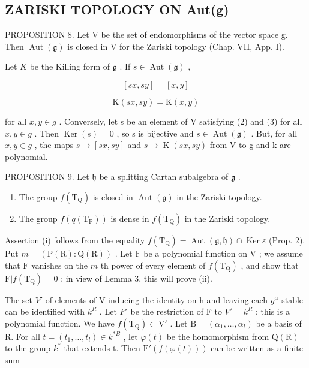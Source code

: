 \subsection{ZARISKI TOPOLOGY ON Aut(g)}

PROPOSITION 8. Let V be the set of endomorphisms of the vector space g. Then \(\operatorname{Aut}(\mathfrak{g})\) is closed in V for the Zariski topology (Chap. VII, App. I).

Let \(K\) be the Killing form of \(\mathfrak{g}\) . If \(s \in \operatorname{Aut}(\mathfrak{g})\) ,

\[
  [ s x, s y ] = [ x, y ]\tag{2}
\]

\[
\mathrm{K} (s x, s y) = \mathrm{K} (x, y)\tag{3}
\]

for all \(x, y \in g\) . Conversely, let s be an element of V satisfying (2) and (3) for all \(x, y \in g\) . Then \(\operatorname{Ker}(s) = 0\) , so s is bijective and \(s \in \operatorname{Aut}(\mathfrak{g})\) . But, for all \(x, y \in g\) , the maps \(s \mapsto [sx, sy]\) and \(s \mapsto \operatorname{K}(sx, sy)\) from V to g and k are polynomial.

PROPOSITION 9. Let \(\mathfrak{h}\) be a splitting Cartan subalgebra of \(\mathfrak{g}\) .

\begin{enumerate}
\def\labelenumi{(\roman{enumi})}
\item
  The group \(f(\mathrm{T}_{\mathrm{Q}})\) is closed in \(\operatorname{Aut}(\mathfrak{g})\) in the Zariski topology.
\item
  The group \(f(q(\mathrm{T_P}))\) is dense in \(f(\mathrm{T_Q})\) in the Zariski topology.
\end{enumerate}

Assertion (i) follows from the equality \(f(\mathrm{T}_{\mathrm{Q}}) = \operatorname{Aut}(\mathfrak{g},\mathfrak{h})\cap \operatorname{Ker}\varepsilon\) (Prop. 2). Put \(m = (\mathrm{P}(\mathrm{R}):\mathrm{Q}(\mathrm{R}))\) . Let \(\mathrm{F}\) be a polynomial function on \(\mathrm{V}\) ; we assume that \(\mathrm{F}\) vanishes on the \(m\) th power of every element of \(f(\mathrm{T}_{\mathrm{Q}})\) , and show that \(\mathrm{F}|f(\mathrm{T}_{\mathrm{Q}}) = 0\) ; in view of Lemma 3, this will prove (ii).

The set \(V'\) of elements of V inducing the identity on h and leaving each \(g^{\alpha}\) stable can be identified with \(k^{R}\) . Let \(F'\) be the restriction of F to \(V' = k^{R}\) ; this is a polynomial function. We have \(f(\mathrm{T}_{\mathrm{Q}}) \subset \mathrm{V}'\) . Let \(\mathrm{B} = (\alpha_{1}, \ldots, \alpha_{l})\) be a basis of R. For all \(t = (t_{1}, \ldots, t_{l}) \in k^{*B}\) , let \(\varphi(t)\) be the homomorphism from \(\mathrm{Q}(\mathrm{R})\) to the group \(k^{*}\) that extends t. Then \(\mathrm{F}'(f(\varphi(t)))\) can be written as a finite sum

